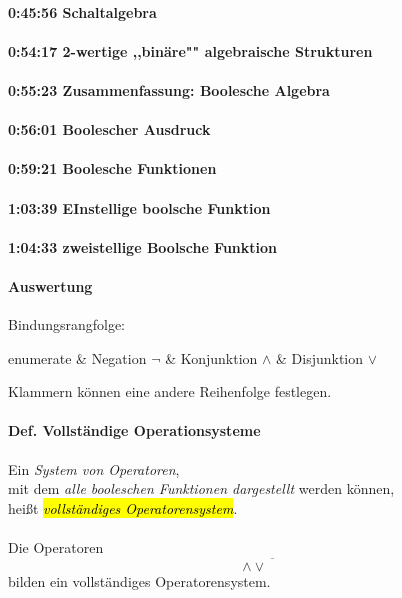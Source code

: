 \documentclass[a4paper]{scrartcl}
\begin{document}
				 \paragraph{0:45:56 Schaltalgebra }
				 \paragraph{0:54:17 2-wertige ,,binäre"" algebraische Strukturen }
				 \paragraph{0:55:23 Zusammenfassung: Boolesche Algebra }
				 \paragraph{0:56:01 Boolescher Ausdruck }
				 \paragraph{0:59:21 Boolesche Funktionen }
				 \paragraph{1:03:39 EInstellige boolsche Funktion }
				 \paragraph{1:04:33 zweistellige Boolsche Funktion }
				 
				 \paragraph{Auswertung}
				 Bindungsrangfolge:
				 \begin{easylist}{enumerate}
				 	& Negation \( \neg \)
				 	& Konjunktion \( \wedge \)
				 	& Disjunktion \( \vee \)
				 \end{easylist}
				 Klammern können eine andere Reihenfolge festlegen.\\
				 
				 \paragraph{Def. Vollständige Operationsysteme} 
				 Ein \emph{System von Operatoren}, \\
				 mit dem \emph{alle booleschen Funktionen dargestellt} werden können,\\
				 heißt \emph{\hl{vollständiges Operatorensystem}}.\\
				 \\
				 Die Operatoren \[ \wedge \vee \overline{\phantom{A}} \] bilden ein vollständiges Operatorensystem.\\
\end{document}
